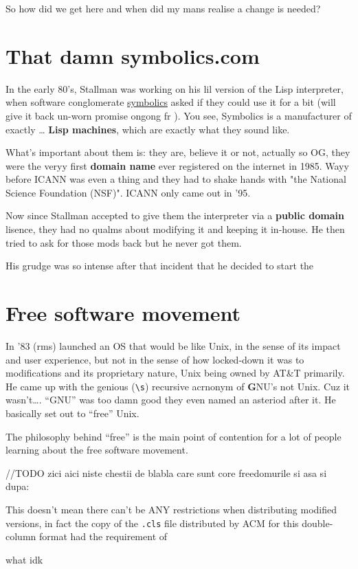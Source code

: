 \documentclass[sigplan,screen]{acmart}
\begin{document}
So how did we get here and when did my mans realise a change is needed?

\section{That damn symbolics.com}
In the early 80's, Stallman was working on his lil version of the Lisp interpreter, when software conglomerate \href{https://symbolics.com}{symbolics} asked if they could use it for a bit (will give it back un-worn promise ongong fr ). You see, Symbolics is a manufacturer of exactly \ldots \textbf{ Lisp machines}, which are exactly what they sound like.

What's important about them is: they are, believe it or not, actually so OG, they were the veryy first \textbf{domain name} ever registered on the internet in 1985. Wayy before ICANN was even a thing and they had to shake hands with "the National Science Foundation (NSF)". ICANN only came out in '95. \cite{national-science-foundation}

Now since Stallman accepted to give them the interpreter via a \textbf{public domain} lisence, they had no qualms about modifying it and keeping it in-house. He then tried to ask for those mods back but he never got them.

His grudge was so intense after that incident that he decided to start the

\section{Free software movement}
In '83 (rms) launched an OS that would be like Unix, in the sense of its impact and user experience, but not in the sense of how locked-down it was to modifications and its proprietary nature, Unix being owned by AT\&T primarily. He came up with the genious (\verb|\s|) recursive acrnonym of \textbf{G}NU's not Unix. Cuz it wasn't\ldots. “GNU” was too damn good they even named an asteriod after it. \cite{gnu-asteriod} He basically set out to “free” Unix.

The philosophy behind “free” is the main point of contention for a lot of people learning about the free software movement.

//TODO zici aici niste chestii de blabla care sunt core freedomurile si asa si dupa:

This doesn't mean there can't be ANY restrictions when distributing modified versions, in fact the copy of the \verb|.cls| file distributed by ACM for this double-column format had the requirement of

\begin{displayquote}
	what idk
\end{displayquote}

\nocite{*}




\end{document}
